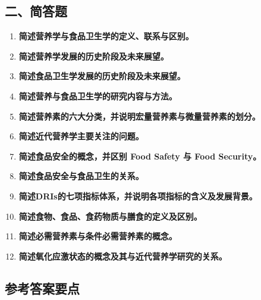 {\subsection*{二、简答题}
\begin{enumerate}[leftmargin=*, itemsep=8pt]
    \item \textbf{简述营养学与食品卫生学的定义、联系与区别。}
    \item \textbf{简述营养学发展的历史阶段及未来展望。}
    \item \textbf{简述食品卫生学发展的历史阶段及未来展望。}
    \item \textbf{简述营养与食品卫生学的研究内容与方法。}
    \item \textbf{简述营养素的六大分类，并说明宏量营养素与微量营养素的划分。}
    \item \textbf{简述近代营养学主要关注的问题。}
    \item \textbf{简述食品安全的概念，并区别 Food Safety 与 Food Security。}
    \item \textbf{简述食品安全与食品卫生的关系。}
    \item \textbf{简述DRIs的七项指标体系，并说明各项指标的含义及发展背景。}
    \item \textbf{简述食物、食品、食药物质与膳食的定义及区别。}
    \item \textbf{简述必需营养素与条件必需营养素的概念。}
    \item \textbf{简述氧化应激状态的概念及其与近代营养学研究的关系。}
\end{enumerate}

\subsection*{参考答案要点}

}
